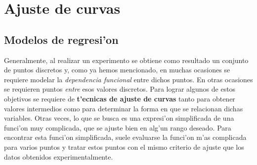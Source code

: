 \chapter{Ajuste de curvas}

\section{Modelos de regresi'on}

Generalmente, al realizar un experimento se obtiene como resultado un conjunto de puntos discretos y, como ya hemos mencionado, en muchas ocasiones se requiere modelar la \textit{dependencia funcional} entre dichos puntos. En otras ocasiones se requieren puntos \textit{entre} esos valores discretos. Para lograr algunos de estos objetivos se requiere de \textbf{t'ecnicas de ajuste de curvas} tanto para obtener valores intermedios como para determinar la forma en que se relacionan dichas variables. 
Otras veces, lo que se busca es una expresi'on simplificada de una funci'on muy complicada, que se ajuste bien en alg'un rango deseado. Para encontrar esta funci'on simplificada, suele evaluarse la funci'on m'as complicada para varios puntos y tratar estos puntos con el mismo criterio de ajuste que los datos obtenidos experimentalmente.
 
